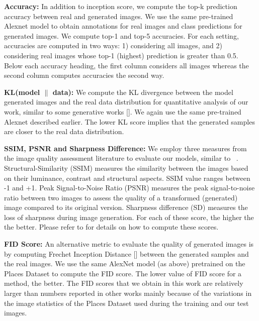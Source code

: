 \documentclass[times,twocolumn,final,authoryear]{elsarticle_modified}
\begin{document}
\noindent \textbf{Accuracy:} In addition to inception score, we compute the top-k prediction accuracy between real and generated images. We use the same pre-trained Alexnet model to obtain annotations for real images and class predictions for generated images. We compute top-1 and top-5 accuracies. For each setting, accuracies are computed in two ways: 1) considering all images, and 2) considering real images whose top-1 (highest) prediction is greater than 0.5. Below each accuracy heading, the first column considers all images whereas the second column computes accuracies the second way. 

\noindent \textbf{KL(model $\|$ data):} 
We compute the KL divergence between the model generated images and the real data distribution for quantitative analysis of our work, similar to some generative works [\cite{che-2016-reg-gan, nguyen2017dual}]. We again use the same pre-trained Alexnet described earlier. The lower KL score implies that the generated samples are closer to the real data distribution. 

\noindent \textbf{SSIM, PSNR and Sharpness Difference:}
We employ three measures from the image quality assessment literature to evaluate our models, similar to ~\cite{DBLP:journals/corr/MathieuCL15, DBLP:conf/cvpr/LedigTHCCAATTWS17,DBLP:conf/cvpr/ShiCHTABRW16,DBLP:journals/corr/ParkYYCB17}. Structural-Similarity (SSIM) measures the similarity between the images based on their luminance, contrast and structural aspects. SSIM value ranges between -1 and +1. Peak Signal-to-Noise Ratio (PSNR) measures the peak signal-to-noise ratio between two images to assess the quality of a transformed (generated) image compared to its original version. Sharpness difference (SD) measures the loss of sharpness during image generation. For each of these score, the higher the the better. Please refer to \cite{Regmi_2018_CVPR} for details on how to compute these scores.

\noindent \textbf{FID Score:} An alternative metric to evaluate the quality of generated images is by computing Frechet Inception Distance [\cite{NIPS2017_7240}] between the generated samples and the real images. We use the same AlexNet model (as above) pretrained on the Places Dataset to compute the FID score. The lower value of FID score for a method, the better. The FID scores that we obtain in this work are relatively larger than numbers reported in other works mainly because of the variations in the image statistics of the Places Dataset used during the training and our test images.
\end{document}
